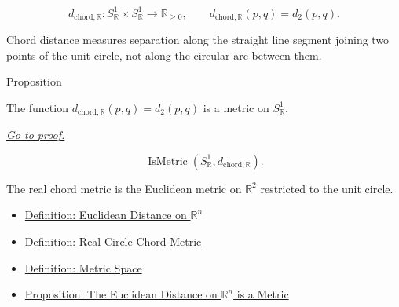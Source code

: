 \begin{remark*}
\[
d_{\mathrm{chord},\mathbb{R}}:
S^1_{\mathbb{R}}\times S^1_{\mathbb{R}}\to\mathbb{R}_{\geq 0},
\qquad
d_{\mathrm{chord},\mathbb{R}}(p,q)=d_2(p,q).
\]
\end{remark*}

\begin{remark*}[Interpretation]
Chord distance measures separation along the straight line segment joining two
points of the unit circle, not along the circular arc between them.
\end{remark*}


\DefinitionalRoot

\begin{propositionbox}{Proposition}
\begin{proposition}
\label{prop:real-circle-chord-metric}
The function \(d_{\mathrm{chord},\mathbb{R}}(p,q)=d_2(p,q)\) is a metric on
\(S^1_{\mathbb{R}}\).

\smallskip
\noindent
\hyperref[prf:real-circle-chord-metric]{\textit{Go to proof.}}
\end{proposition}
\end{propositionbox}

\begin{remark*}
\[
  \operatorname{IsMetric}(S^1_{\mathbb{R}},d_{\mathrm{chord},\mathbb{R}}).
\]
\end{remark*}

\begin{remark*}[Interpretation]
The real chord metric is the Euclidean metric on \(\mathbb{R}^2\) restricted
to the unit circle.
\end{remark*}

\begin{dependencies}
\begin{itemize}
  \item \hyperref[def:euclidean-distance-rn]{Definition: Euclidean Distance on \(\mathbb{R}^n\)}
  \item \hyperref[def:real-circle-chord-metric]{Definition: Real Circle Chord Metric}
  \item \hyperref[def:metric-space]{Definition: Metric Space}
  \item \hyperref[prop:euclidean-distance-rn-metric]{Proposition: The Euclidean Distance on \(\mathbb{R}^n\) is a Metric}
\end{itemize}
\end{dependencies}

